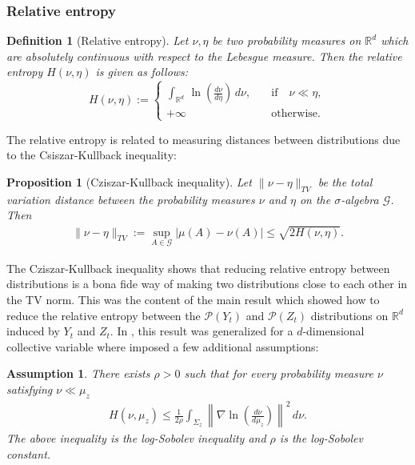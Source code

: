 \documentclass[reqno, 12pt]{article}
\newtheorem{definition}{Definition}
\newtheorem{proposition}{Proposition}
\newtheorem{assumption}{Assumption}
\begin{document}
\subsubsection{Relative entropy}

\begin{definition}[Relative entropy]
    Let $\nu, \eta$ be two probability measures on $\mathbb{R}^d$ which are absolutely continuous with respect to the Lebesgue measure. Then the relative entropy $H(\nu,\eta)$ is given as follows: 
    \begin{equation}
        H(\nu,\eta) := \begin{cases}
            \int_{\mathbb{R}^d} \, \ln\left(\frac{d\nu}{d\eta}\right)\,d\nu, \quad &\text{if} \quad \nu \ll \eta, \\
            +\infty \quad &\text{otherwise}.
        \end{cases}
    \end{equation}
\end{definition}

The relative entropy is related to measuring distances between distributions due to the Csiszar-Kullback inequality:

\begin{proposition}[Cziszar-Kullback inequality]
    Let $\|\nu - \eta\|_{TV}$ be the \emph{total variation} distance between the probability measures $\nu$ and $\eta$ on the $\sigma$-algebra $\mathcal{G}$. Then 
    \begin{align}
        \|\nu - \eta\|_{TV} := \underset{A \in \mathcal{G}}{\sup}|\mu(A) - \nu(A)| \leq \sqrt{2 H(\nu,\eta)} \label{eq: cziszar-kullback}.
    \end{align}
\end{proposition}

The Cziszar-Kullback inequality shows that reducing relative entropy between distributions is a bona fide way of making two distributions close to each other in the TV norm. This was the content of the main result  \parencite{legoll2010effective} which showed how to reduce the relative entropy between the $\mathcal{P}(Y_t)$ and $\mathcal{P}(Z_t)$ distributions on $\mathbb{R}^d$ induced by $Y_t$ and $Z_t$. In \parencite{duong2018quantification}, this result was generalized for a $d$-dimensional collective variable where \cite{duong2018quantification} imposed a few additional assumptions: 

\begin{assumption}
\label{ass: rho}
    There exists $\rho > 0$ such that for every probability measure $\nu$ satisfying $\nu \ll \mu_{z}$
    \begin{align}
        H(\nu, \mu_{z}) \leq \frac{1}{2\rho}\int_{\Sigma_{z}}\left\|\nabla \ln \left( \frac{d\nu}{d\mu_z}\right)\right\|^2\,d\nu. \label{eq: log sobolev}
    \end{align}
    The above inequality is the \emph{log-Sobolev} inequality and $\rho$ is the log-Sobolev constant. 
\end{assumption}
\end{document}
